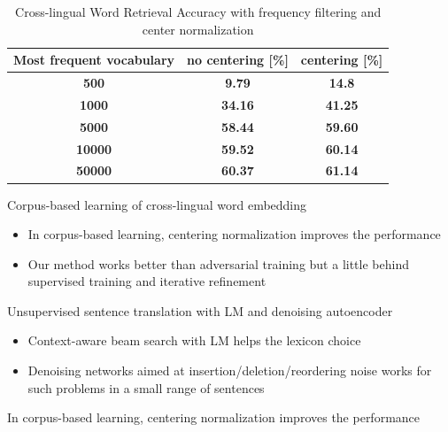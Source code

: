 \documentclass[11pt, a4paper, landscape]{article}
\begin{document}
\NewPage
{}	
\vfill
\begin{table}
	\caption{Cross-lingual Word Retrieval Accuracy with frequency filtering and center normalization}
	\centering
	\begin{tabular}{>{\bfseries}c>{\bfseries}c>{\bfseries}c}
		\hline
		Most frequent vocabulary	& no centering [\%] & centering    [\%]    \\ \hline
		500                           & 9.79 & 14.8    \\ \hline
		1000            & 34.16 &          41.25         \\ \hline
		5000                                           & 58.44 &   59.60    \\ \hline
		10000                               & 59.52 & 60.14   \\ \hline
		50000                                           & 60.37 & 61.14 \\ \hline
	\end{tabular}
	
\end{table}
\vfill


	\NewPage
	\vfill
	Corpus-based learning of cross-lingual word embedding
	\begin{itemize}
	\item In corpus-based learning, centering normalization improves the performance
	\item Our method works better than adversarial training but a little behind supervised training and iterative refinement
	\end{itemize}
	Unsupervised sentence translation with LM and denoising autoencoder
	\begin{itemize}
		\item Context-aware beam search with LM helps the lexicon choice
	\item Denoising networks aimed at insertion/deletion/reordering noise works for such problems in a small range of sentences\\
	\end{itemize}In corpus-based learning, centering normalization improves the performance
	\vfill
\end{document}
